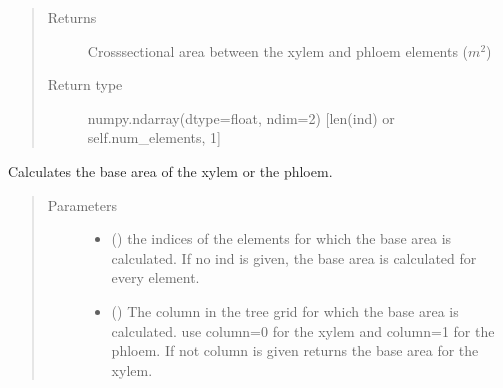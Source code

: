 \documentclass[letterpaper,10pt,english]{sphinxmanual}
\begin{document}
\begin{fulllineitems}
\begin{fulllineitems}
\begin{quote}
\begin{description}
\item[{Returns}] \leavevmode
Cross\sphinxhyphen{}sectional area
between the xylem and phloem elements (\(m^2\))

\item[{Return type}] \leavevmode
numpy.ndarray(dtype=float, ndim=2) {[}len(ind) or self.num\_elements, 1{]}

\end{description}\end{quote}

\end{fulllineitems}


\begin{fulllineitems}
\label{\detokenize{index:src.tree.Tree.element_area}}
Calculates the base area of the xylem or the phloem.
\begin{quote}\begin{description}
\item[{Parameters}] \leavevmode\begin{itemize}
\item {} 
 (\sphinxstyleliteralemphasis{\sphinxupquote{{[}}}\sphinxstyleliteralemphasis{\sphinxupquote{{]} or }}\sphinxstyleliteralemphasis{\sphinxupquote{(}}\sphinxstyleliteralemphasis{\sphinxupquote{, }}\sphinxstyleliteralemphasis{\sphinxupquote{)}}\sphinxstyleliteralemphasis{\sphinxupquote{, }}) \textendash{} the indices of the elements
for which the base area is calculated. If no ind is given, the base area is calculated
for every element.

\item {} 
 (\sphinxstyleliteralemphasis{\sphinxupquote{, }}) \textendash{} The column in the tree grid for which the base area is calculated.
use column=0 for the xylem and column=1 for the phloem. If not column is given returns
the base area for the xylem.


\end{itemize}
\end{description}
\end{quote}
\end{fulllineitems}
\end{fulllineitems}
\end{document}
